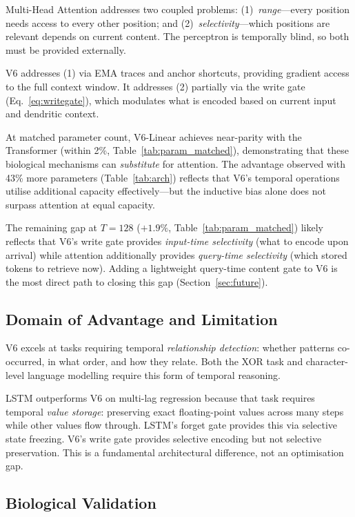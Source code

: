 \documentclass[11pt,a4paper]{article}
\begin{document}
Multi-Head Attention addresses two coupled problems:
(1)~\emph{range}---every position needs access to every other position; and
(2)~\emph{selectivity}---which positions are relevant depends on current content.
The perceptron is temporally blind, so both must be provided externally.

V6 addresses (1) via EMA traces and anchor shortcuts,
providing gradient access to the full context window.
It addresses (2) partially via the write gate (Eq.~\ref{eq:writegate}),
which modulates what is encoded based on current input and dendritic context.

At matched parameter count, V6-Linear achieves near-parity with the
Transformer (within 2\%, Table~\ref{tab:param_matched}), demonstrating
that these biological mechanisms can \emph{substitute} for attention.
The advantage observed with 43\% more parameters (Table~\ref{tab:arch})
reflects that V6's temporal operations utilise additional capacity
effectively---but the inductive bias alone does not surpass attention
at equal capacity.

The remaining gap at $T=128$ ($+1.9\%$, Table~\ref{tab:param_matched})
likely reflects
that V6's write gate provides \emph{input-time selectivity}
(what to encode upon arrival) while attention additionally provides
\emph{query-time selectivity} (which stored tokens to retrieve now).
Adding a lightweight query-time content gate to V6 is the most direct
path to closing this gap (Section~\ref{sec:future}).

\subsection{Domain of Advantage and Limitation}

V6 excels at tasks requiring temporal \emph{relationship detection}:
whether patterns co-occurred, in what order, and how they relate.
Both the XOR task and character-level language modelling
require this form of temporal reasoning.

LSTM outperforms V6 on multi-lag regression because that task requires
temporal \emph{value storage}: preserving exact floating-point values
across many steps while other values flow through.
LSTM's forget gate provides this via selective state freezing.
V6's write gate provides selective encoding but not selective preservation.
This is a fundamental architectural difference, not an optimisation gap.

\subsection{Biological Validation}
\end{document}
